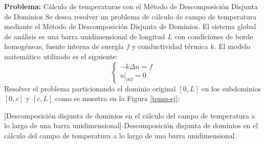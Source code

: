 \medskip

\begin{EvalBox}{\textbf{Problema:} Cálculo de temperaturas con el Método de Descomposición Disjunta de Dominios}
\setlength\parindent{16pt}
Se desea resolver un problema de cálculo de campo de temperatura mediante el Método de Descomposición Disjunta de Dominios.
El sistema global de análisis es una barra unidimensional de longitud $L$ con condiciones de borde homogéneas, fuente interna de energía $f$ y conductividad térmica $k$.
El modelo matemático utilizado es el siguiente:
\begin{equation}
\left\{\begin{matrix}
-k \Delta u=f \\
\left.u\right|_{\partial\Omega}=0
\end{matrix}\right.
\label{ecuacion-calor}
\end{equation}
Resolver el problema particionando el dominio original $[0,L]$ en los subdominios $[0,c]$ y $[c,L]$ como se muestra en la Figura \ref{temp-ej}:
    
  \centering
  [Descomposición disjunta de dominios en el cálculo del campo de temperatura a lo largo de una barra unidimensional]
  {Descomposición disjunta de dominios en el cálculo del campo de temperatura a lo largo de una barra unidimensional.}
  \label{temp-ej}
  
\end{EvalBox}

